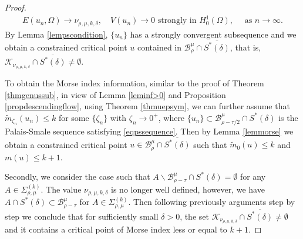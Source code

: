 \documentclass[10pt,a4paper]{article}
\theoremstyle{definition} \theoremstyle{remark}
\numberwithin{equation}{section}
\newcommand{\B}{\mathcal{B}}
\newcommand{\K}{\mathcal{K}}
\begin{document}
\begin{proof}
    \begin{align} \label{eqpssequence}
    	E(u_n,\Omega) \to \nu_{\rho,\mu,k,\delta}, \quad V(u_n) \to 0 \text{ strongly in } H_0^1(\Omega), \quad \text{ as } n \to \infty.
    \end{align}
    By Lemma \ref{lempscondition}, $\{u_n\}$ has a strongly convergent subsequence and we obtain a constrained critical point $u$ contained in $\B_\rho^\mu \cap \overline{S^*(\delta)}$, that is, $\K_{\nu_{\rho,\mu,k,\delta}} \cap \overline{S^*(\delta)} \neq \emptyset$.

    To obtain the Morse index information, similar to the proof of Theorem \ref{thmgenussub}, in view of Lemma \ref{leminf>0} and Proposition \ref{propdescendingflow}, using Theorem \ref{thmuepsym}, we can further assume that $\tilde m_{\zeta_n} (u_n) \leq k$ for some $\{\zeta_n\}$ with $\zeta_n \to 0^+$, where $\{u_n\}\subset \B_{\rho-\tau/2}^\mu \cap S^*(\delta)$ is the Palais-Smale sequence satisfying \eqref{eqpssequence}. Then by Lemma \ref{lemmorse} we obtain a constrained critical point $u \in \B_\rho^\mu \cap \overline{S^*(\delta)}$ such that $\tilde m_0(u) \leq k$ and $m(u) \leq k+1$.

    Secondly, we consider the case such that $A \backslash \B_{\rho -\tau}^\mu \cap S^*(\delta) = \emptyset$ for any $A \in \Sigma_{\rho,\mu}^{(k)}$. The value $\nu_{\rho,\mu,k,\delta}$ is no longer well defined, however, we have $A \cap S^*(\delta) \subset \B_{\rho -\tau}^\mu$ for $A \in \Sigma_{\rho,\mu}^{(k)}$. Then following previously arguments step by step we conclude that for sufficiently small $\delta > 0$, the set $\K_{\nu_{\rho,\mu,k,\delta}} \cap \overline{S^*(\delta)} \neq \emptyset$ and it contains a critical point of Morse index less or equal to $k+1$.


\end{proof}
\end{document}
